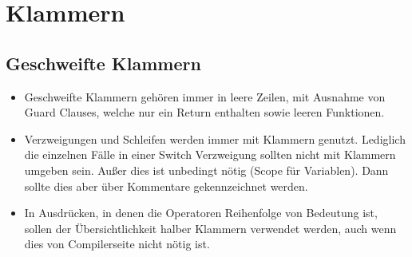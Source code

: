 \section{Klammern}

\subsection{Geschweifte Klammern}

\begin{itemize}[leftmargin=*]
    \item Geschweifte Klammern gehören immer in leere Zeilen, mit Ausnahme von Guard Clauses, welche nur ein Return enthalten sowie leeren Funktionen.
    \item Verzweigungen und Schleifen werden immer mit Klammern genutzt. Lediglich die einzelnen Fälle in einer Switch Verzweigung sollten nicht mit Klammern umgeben sein. Außer dies ist unbedingt nötig (Scope für Variablen). Dann sollte dies aber über Kommentare gekennzeichnet werden.
    \item In Ausdrücken, in denen die Operatoren Reihenfolge von Bedeutung ist, sollen der Übersichtlichkeit halber Klammern verwendet werden,  auch wenn dies von Compilerseite nicht nötig ist.
\end{itemize}